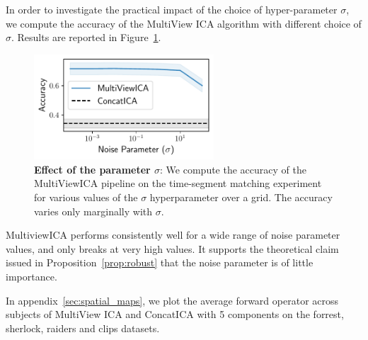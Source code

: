 In order to investigate the practical impact of the choice of hyper-parameter
$\sigma$, we compute the accuracy of the MultiView ICA algorithm with different
choice of $\sigma$.
Results are reported in Figure~\ref{fig:supp_noise_sensitivity}. 
\begin{figure}
  \centering
  \includegraphics[width=0.6\textwidth]{figures/mvica/noise_sensitivity.pdf}
  \caption{\textbf{Effect of the parameter $\sigma$}: We compute the accuracy of the MultiViewICA pipeline on the time-segment matching experiment for various values of the $\sigma$ hyperparameter over a grid. The accuracy varies only marginally with $\sigma$.}
  \label{fig:supp_noise_sensitivity}
\end{figure}
MultiviewICA performs consistently well for a wide range of noise parameter values, and only breaks at very high values. It supports the theoretical claim issued in Proposition~\ref{prop:robust} that the noise parameter is of little importance.

In appendix~\ref{sec:spatial_maps}, we plot the average forward operator across subjects of MultiView ICA and ConcatICA with 5 components on the forrest, sherlock, raiders and clips datasets.



